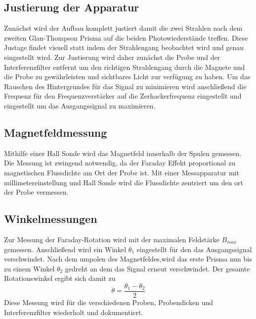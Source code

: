 \subsection{Justierung der Apparatur}
Zunächst wird der Aufbau komplett justiert damit die zwei Strahlen nach dem zweiten Glan-Thompson Prisma auf die beiden Photowiederstände treffen.
Diese Justage findet visuell statt indem der Strahlengang beobachtet wird und genau eingestellt wird.
Zur Justierung wird daher zunächst die Probe und der Interferenzfilter entfernt um den richtigen Strahlengang durch die Magnete und die Probe zu gewährleisten und sichtbares Licht zur verfügung zu haben.
Um das Rauschen des Hintergrundes für das Signal zu minimieren wird anschließend die Frequenz für den Frequenzverstärker auf die Zerhackerfrequenz eingestellt und eingestellt um das Ausgangssignal zu maximieren.
\subsection{Magnetfeldmessung}
Mithilfe einer Hall Sonde wird das Magnetfeld innerhalb der Spulen gemessen.
Die Messung ist zwingend notwendig, da der Faraday Effekt proportional zu magnetischen Flussdichte am Ort der Probe ist.
Mit einer Messapparatur mit millimetereinstellung und Hall Sonde wird die Flussdichte zentriert um den ort der Probe vermessen.
\subsection{Winkelmessungen}
Zur Messung der Faraday-Rotation wird mit der maximalen Feldstärke $B_{max}$ gemessen.
Anschließend wird ein Winkel $\theta_1$ eingestellt für den das Ausgangssignal verschwindet.
Nach dem umpolen des Magnetfeldes,wird das erste Prisma nun bis zu einem Winkel $\theta_2$ gedreht an dem das Signal erneut verschwindet.
Der gesamte Rotationswinkel ergibt sich damit zu 
\begin{equation*}
    \theta = \frac{\theta_1 - \theta_2}{2}
\end{equation*}
Diese Messung wird für die verschiedenen Proben, Probendicken und Interferenzfilter wiederholt und dokumentiert.
